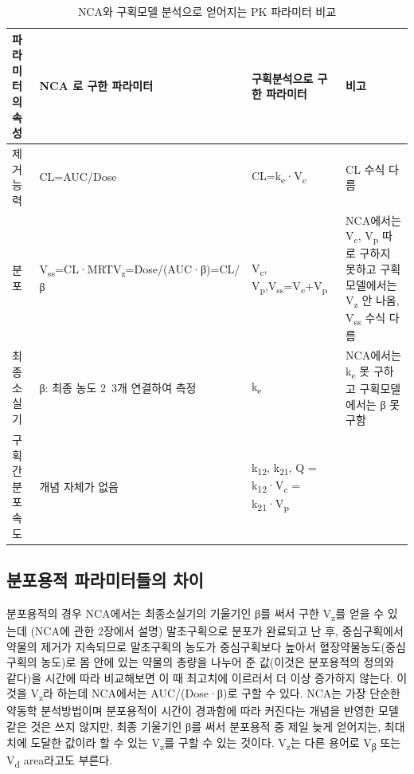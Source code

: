 \documentclass[
  11pt,
  krantz2, a4paper, twoside]{krantz}
\theoremstyle{definition}
\theoremstyle{definition}
\theoremstyle{definition}
\theoremstyle{definition}
\theoremstyle{remark}
\begin{document}
\begin{table}

\caption{\label{tab:pk-param-comparison}NCA와 구획모델 분석으로 얻어지는 PK 파라미터 비교}
\centering
\begin{tabular}[t]{>{\raggedright\arraybackslash}p{2.0cm}>{\raggedright\arraybackslash}p{4.0cm}>{\raggedright\arraybackslash}p{4.0cm}>{\raggedright\arraybackslash}p{3.0cm}}
\toprule
파라미터의 속성 & NCA 로 구한 파라미터 & 구획분석으로 구한 파라미터 & 비고\\
\midrule
제거능력 & CL=AUC/Dose & CL=k\textsubscript{e}·V\textsubscript{c} & CL 수식 다름\\
분포 & V\textsubscript{ss}=CL·MRT\newline V\textsubscript{z}=Dose/(AUC·β)=CL/β & V\textsubscript{c}, V\textsubscript{p},\newline V\textsubscript{ss}=V\textsubscript{c}+V\textsubscript{p} & NCA에서는 V\textsubscript{c}, V\textsubscript{p} 따로 구하지 못하고 구획모델에서는 V\textsubscript{z} 안 나옴, \newline V\textsubscript{ss} 수식 다름\\
최종소실기 & β: 최종 농도 2~3개 연결하여 측정 & k\textsubscript{e} & NCA에서는 k\textsubscript{e} 못 구하고 구획모델에서는 β 못 구함\\
구획간 분포 속도 & 개념 자체가 없음 & k\textsubscript{12}, k\textsubscript{21}, \newline  Q = k\textsubscript{12}·V\textsubscript{c} = k\textsubscript{21}·V\textsubscript{p} & \\
\bottomrule
\end{tabular}
\end{table}

\normalsize

\hypertarget{uxbd84uxd3ecuxc6a9uxc801-uxd30cuxb77cuxbbf8uxd130uxb4e4uxc758-uxcc28uxc774}{%
\subsection{분포용적 파라미터들의 차이}\label{uxbd84uxd3ecuxc6a9uxc801-uxd30cuxb77cuxbbf8uxd130uxb4e4uxc758-uxcc28uxc774}}


분포용적의 경우 NCA에서는 최종소실기의 기울기인 β를 써서 구한 V\textsubscript{z}를
얻을 수 있는데 (NCA에 관한 2장에서 설명) 말초구획으로 분포가 완료되고 난
후, 중심구획에서 약물의 제거가 지속되므로 말초구획의 농도가 중심구획보다
높아서 혈장약물농도(중심구획의 농도)로 몸 안에 있는 약물의 총량을 나누어
준 값(이것은 분포용적의 정의와 같다)을 시간에 따라 비교해보면 이 때
최고치에 이르러서 더 이상 증가하지 않는다. 이것을 V\textsubscript{z}라 하는데
NCA에서는 AUC/(Dose·β)로 구할 수 있다. NCA는 가장 단순한 약동학
분석방법이며 분포용적이 시간이 경과함에 따라 커진다는 개념을 반영한 모델
같은 것은 쓰지 않지만, 최종 기울기인 β를 써서 분포용적 중 제일 늦게
얻어지는, 최대치에 도달한 값이라 할 수 있는 V\textsubscript{z}를 구할 수 있는 것이다. V\textsubscript{z}는 다른
용어로 V\textsubscript{β} 또는 V\textsubscript{d} area라고도 부른다.
\end{document}
